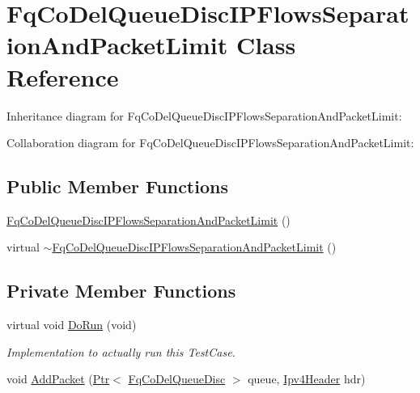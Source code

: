 \hypertarget{classFqCoDelQueueDiscIPFlowsSeparationAndPacketLimit}{}\section{Fq\+Co\+Del\+Queue\+Disc\+I\+P\+Flows\+Separation\+And\+Packet\+Limit Class Reference}
\label{classFqCoDelQueueDiscIPFlowsSeparationAndPacketLimit}


Inheritance diagram for Fq\+Co\+Del\+Queue\+Disc\+I\+P\+Flows\+Separation\+And\+Packet\+Limit\+:


Collaboration diagram for Fq\+Co\+Del\+Queue\+Disc\+I\+P\+Flows\+Separation\+And\+Packet\+Limit\+:
\subsection*{Public Member Functions}
\begin{DoxyCompactItemize}
\item 
\hyperlink{classFqCoDelQueueDiscIPFlowsSeparationAndPacketLimit_ad40f1d88d58fdd9d9d4809c4c1f57f2f}{Fq\+Co\+Del\+Queue\+Disc\+I\+P\+Flows\+Separation\+And\+Packet\+Limit} ()
\item 
virtual \hyperlink{classFqCoDelQueueDiscIPFlowsSeparationAndPacketLimit_a2907f63b8c095d6d129a3b04388c7a10}{$\sim$\+Fq\+Co\+Del\+Queue\+Disc\+I\+P\+Flows\+Separation\+And\+Packet\+Limit} ()
\end{DoxyCompactItemize}
\subsection*{Private Member Functions}
\begin{DoxyCompactItemize}
\item 
virtual void \hyperlink{classFqCoDelQueueDiscIPFlowsSeparationAndPacketLimit_afc60f270315ee2655e79ac8b8e2bb21b}{Do\+Run} (void)
\begin{DoxyCompactList}\small\item\em Implementation to actually run this Test\+Case. \end{DoxyCompactList}\item 
void \hyperlink{classFqCoDelQueueDiscIPFlowsSeparationAndPacketLimit_abcc442c698eb2bcd3b6cafe34d751297}{Add\+Packet} (\hyperlink{classns3_1_1Ptr}{Ptr}$<$ \hyperlink{classns3_1_1FqCoDelQueueDisc}{Fq\+Co\+Del\+Queue\+Disc} $>$ queue, \hyperlink{classns3_1_1Ipv4Header}{Ipv4\+Header} hdr)
\end{DoxyCompactItemize}
